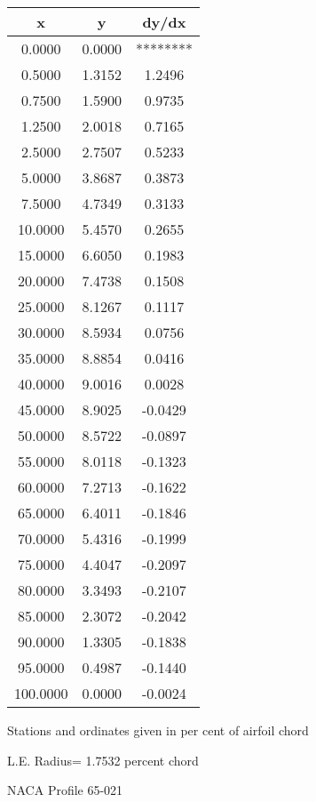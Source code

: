 \documentclass[11pt]{book}
\begin{document}
 \vspace{8mm}
 \begin{tabular}{|c|c|c|} \hline 
  x  &  y  &  dy/dx \\
 \hline
0.0000 & 0.0000 & ******** \\
0.5000 & 1.3152 & 1.2496 \\
0.7500 & 1.5900 & 0.9735 \\
1.2500 & 2.0018 & 0.7165 \\
2.5000 & 2.7507 & 0.5233 \\
5.0000 & 3.8687 & 0.3873 \\
7.5000 & 4.7349 & 0.3133 \\
10.0000 & 5.4570 & 0.2655 \\
15.0000 & 6.6050 & 0.1983 \\
20.0000 & 7.4738 & 0.1508 \\
25.0000 & 8.1267 & 0.1117 \\
30.0000 & 8.5934 & 0.0756 \\
35.0000 & 8.8854 & 0.0416 \\
40.0000 & 9.0016 & 0.0028 \\
45.0000 & 8.9025 & -0.0429 \\
50.0000 & 8.5722 & -0.0897 \\
55.0000 & 8.0118 & -0.1323 \\
60.0000 & 7.2713 & -0.1622 \\
65.0000 & 6.4011 & -0.1846 \\
70.0000 & 5.4316 & -0.1999 \\
75.0000 & 4.4047 & -0.2097 \\
80.0000 & 3.3493 & -0.2107 \\
85.0000 & 2.3072 & -0.2042 \\
90.0000 & 1.3305 & -0.1838 \\
95.0000 & 0.4987 & -0.1440 \\
100.0000 & 0.0000 & -0.0024 \\
 \hline
 \end{tabular}
 \vspace{8mm}


Stations and ordinates given in per cent of airfoil chord 


L.E. Radius=  1.7532 percent chord
 \newpage
  \label{p65-021}
 \begin{Large}
 NACA Profile 65-021
 \end{Large}
  
\end{document}
